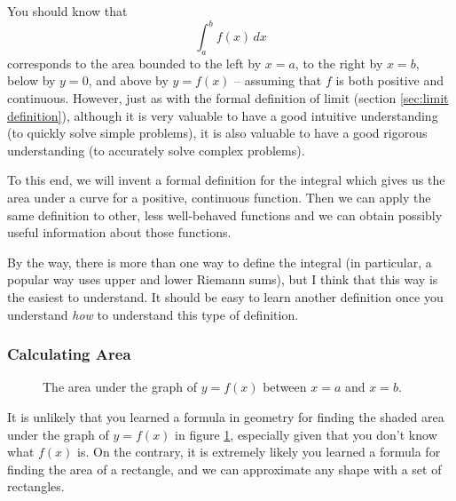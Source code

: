 \documentclass{myarticle}
\theoremstyle{nospace}
\newtheorem{old series theorem}{Theorem}
\newenvironment{series theorem}{\begin{mdframed}\begin{old series theorem}}{\end{old series theorem}\end{mdframed}}
\begin{document}
You should know that \[ \int_a^b f(x) \,dx \] corresponds to the area bounded to the left by $x = a$, to the right by $x = b$, below by $y = 0$, and above by $y = f(x)$ -- assuming that $f$ is both positive and continuous. However, just as with the formal definition of limit (section \ref{sec:limit definition}), although it is very valuable to have a good intuitive understanding (to quickly solve simple problems), it is also valuable to have a good rigorous understanding (to accurately solve complex problems).

To this end, we will invent a formal definition for the integral which gives us the area under a curve for a positive, continuous function. Then we can apply the same definition to other, less well-behaved functions and we can obtain possibly useful information about those functions.

By the way, there is more than one way to define the integral (in particular, a popular way uses upper and lower Riemann sums), but I think that this way is the easiest to understand. It should be easy to learn another definition once you understand \emph{how} to understand this type of definition.

\subsubsection{Calculating Area} \label{sec:integral definition area}

\begin{figure}[htb!] \centering
{}
\caption{The area under the graph of $y = f(x)$ between $x = a$ and $x = b$.}
\label{fig:area 0}
\end{figure}

It is unlikely that you learned a formula in geometry for finding the shaded area under the graph of $y = f(x)$ in figure \ref{fig:area 0}, especially given that you don't know what $f(x)$ is. On the contrary, it is extremely likely you learned a formula for finding the area of a rectangle, and we can approximate any shape with a set of rectangles.
\end{document}
